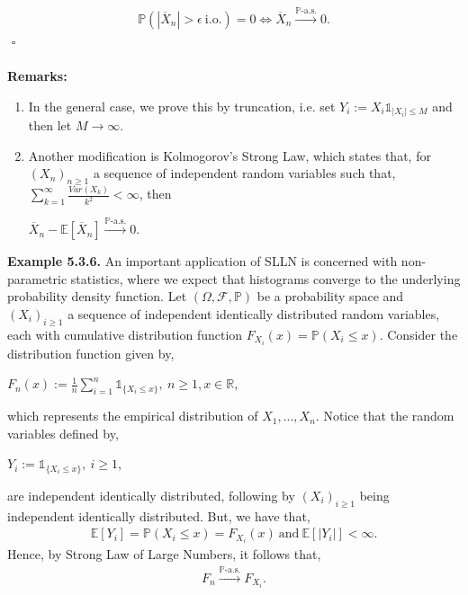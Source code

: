 \documentclass{article}
\begin{document}
\begin{eqnarray}
\nonumber
\mathbb{P}(|\overline{X}_n| > \epsilon \ \text{i.o.}) = 0 \iff \overline{X}_n \xrightarrow{\mathbb{P}\text{-a.s.}} 0.
\end{eqnarray}
${}$ \hfill $\square$\\\\
\textbf{Remarks:}
\begin{enumerate}
	\item In the general case, we prove this by truncation, i.e. set $Y_i := X_i\mathds{1}_{|X_i| \leq M}$ and then let $M\to\infty$.
	\item Another modification is Kolmogorov's Strong Law, which states that, for $(X_n)_{n\geq1}$ a sequence of independent random variables such that, $\sum_{k=1}^{\infty}\frac{Var(X_k)}{k^2} < \infty$, then
	\begin{center}
		$\overline{X}_n - \mathbb{E}[\overline{X}_n] \xrightarrow{\mathbb{P}\text{-a.s.}} 0$.
	\end{center}
\end{enumerate}
\textbf{Example 5.3.6.} An important application of SLLN is concerned with non-parametric statistics, where we expect that histograms converge to the underlying probability density function. Let $(\Omega,\mathcal{F},\mathbb{P})$ be a probability space and $(X_i)_{i\geq1}$ a sequence of independent identically distributed random variables, each with cumulative distribution function $F_{X_i}(x) = \mathbb{P}(X_i \leq x)$. Consider the distribution function given by,
\begin{center}
	$F_n(x) := \frac{1}{n}\sum_{i=1}^{n}\mathds{1}_{\{X_i \leq x\}}, \ n\geq1 , x \in \mathbb{R}$,
\end{center}
which represents the empirical distribution of $X_1,...,X_n$. Notice that the random variables defined by,
\begin{center}
	$Y_i := \mathds{1}_{\{X_i \leq x\}}, \ i\geq1$,
\end{center}
are independent identically distributed, following by $(X_i)_{i\geq1}$ being independent identically distributed. But, we have that,
\begin{eqnarray}
\nonumber
\mathbb{E}[Y_i] = \mathbb{P}(X_i \leq x) = F_{X_i}(x) \ \text{and} \ \mathbb{E}[|Y_i|] < \infty.
\end{eqnarray}
Hence, by Strong Law of Large Numbers, it follows that,
\begin{eqnarray}
\nonumber
F_n \xrightarrow{\mathbb{P}\text{-a.s.}} F_{X_i}.
\end{eqnarray}
\end{document}
